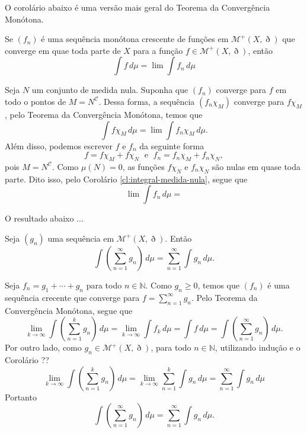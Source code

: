 \documentclass[a4paper, 11pt]{book}
\theoremstyle{definition}
\newcommand{\bN}{\mathbb{N}}
\newcommand{\cC}{\mathcal{C}}
\newcommand{\cM}{\mathcal{M}}
\begin{document}
O corolário abaixo é uma versão mais geral do Teorema da Convergência Monótona.

\begin{cbox} \label{cl:convergencia-monotona-qtp}
    Se $(f_n)$ é uma sequência monótona crescente de funções em $\cM^+(X,\eth)$ que converge em quae toda parte de $X$ para a função $f \in \cM^+(X,\eth)$, então
    \[
        \int f \, d\mu = \lim \int f_n \, d\mu
    \]
\end{cbox}
\begin{prf}
    Seja $N$ um conjunto de medida nula. Suponha que $(f_n)$ converge para $f$ em todo o pontos de $M = N^{\cC}$.
    Dessa forma, a sequência $(f_n \chi_M)$ converge para $f\chi_M$, pelo Teorema da Convergência Monótona, temos que
    \[
        \int f \chi_M \, d\mu = \lim \int f_n \chi_M \, d\mu.
    \]
    Além disso, podemos escrever $f$ e $f_n$ da seguinte forma
    \[
        f = f \chi_M + f \chi_N \;\text{ e }\; f_n = f_n \chi_M + f_n \chi_N,
    \]
    pois $M = N^{\cC}$.
    Como $\mu(N) = 0$, as funções $f \chi_N$ e $f_n \chi_N$ são nulas em quase toda parte.
    Dito isso, pelo Corolário \ref{cl:integral-medida-nula}, segue que
    \[
        \lim \int f_n \, d\mu = 
    \]
\end{prf}

O resultado abaixo ...

\begin{cbox}
    Seja $(g_n)$ uma sequência em $\cM^+(X,\eth)$. Então
    \[
        \int \left( \sum_{n=1}^{\infty} g_n \right) \, d\mu = \sum_{n=1}^{\infty} \int g_n \, d\mu.
    \]
\end{cbox}
\begin{prf}
    Seja $f_n = g_1 + \cdots + g_n$ para todo $n \in \bN$. Como $g_n \geqslant 0$, temos que $(f_n)$ é uma sequência crecente que converge para $f = \sum_{n=1}^{\infty} g_n$. 
    Pelo Teorema da Convergência Monótona, segue que
    \[
        \lim_{k \to \infty} \int \left( \sum_{n=1}^{k} g_n \right) \, d\mu = \lim_{k\to\infty} \int f_k \, d \mu = \int f \, d\mu = \int \left( \sum_{n=1}^{\infty} g_n \right) \, d\mu.
    \]
    Por outro lado, como $g_n \in \cM^+(X,\eth)$, para todo $n \in \bN$, utilizando indução e o Corolário ??
    \[
        \lim_{k \to \infty} \int \left( \sum_{n=1}^{k} g_n \right) \,d\mu = \lim_{k\to \infty} \sum_{n=1}^{k} \int g_n \, d\mu = \sum_{n=1}^{\infty} \int g_n \, d\mu
    \]
    Portanto
    \[
        \int \left( \sum_{n=1}^{\infty} g_n \right) \, d\mu = \sum_{n=1}^{\infty} \int g_n \, d\mu.
    \]
\end{prf}
\end{document}
